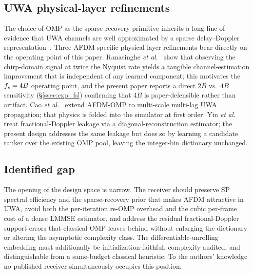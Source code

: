 \subsection{UWA physical-layer refinements}
\label{ssec:related_uwa}

The choice of OMP as the sparse-recovery primitive inherits a long line
of evidence that UWA channels are well approximated by a sparse
delay--Doppler representation~\cite{stojanovic2009uwa,preisig2007uwa,berger2010uwasparse,huang2010uwamimoofdm,junejo2018labomp}.
Three AFDM-specific physical-layer refinements bear directly on the
operating point of this paper. Ranasinghe \emph{et
al.}~\cite{ma2024oversampledafdm} show that observing the chirp-domain
signal at twice the Nyquist rate yields a tangible channel-estimation
improvement that is independent of any learned component; this motivates
the $f_s=4B$ operating point, and the present paper reports a direct $2B$
vs.\ $4B$ sensitivity (\S\ref{ssec:exp_fs}) confirming that $4B$ is
paper-defensible rather than artifact. Cao \emph{et
al.}~\cite{zhou2024msmlafdm} extend AFDM-OMP to multi-scale multi-lag
UWA propagation; that physics is folded into the simulator at first
order. Yin \emph{et al.}~\cite{yin2024drceafdm} treat fractional-Doppler
leakage via a diagonal-reconstruction estimator; the present design
addresses the same leakage but does so by learning a candidate ranker
over the existing OMP pool, leaving the integer-bin dictionary
unchanged.

\subsection{Identified gap}
\label{ssec:related_gap}

The opening of the design space is narrow. The receiver should preserve
SP spectral efficiency and the sparse-recovery prior that makes AFDM
attractive in UWA, avoid both the per-iteration re-OMP overhead and the
cubic per-frame cost of a dense LMMSE estimator, and address the
residual fractional-Doppler support errors that classical OMP leaves
behind without enlarging the dictionary or altering the asymptotic
complexity class. The differentiable-unrolling embedding must
additionally be initialization-faithful, complexity-audited, and
distinguishable from a same-budget classical heuristic. To the authors'
knowledge no published receiver simultaneously occupies this position.
